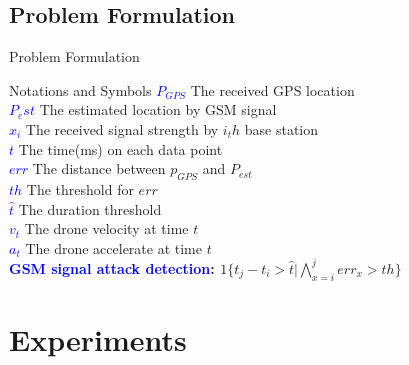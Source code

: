 \documentclass[aspectratio=169, 8pt]{beamer}
\begin{document}
\subsection{Problem Formulation}
\begin{frame}{Problem Formulation}
\begin{block}{Notations and Symbols}
    \textbf{\textcolor{blue}{$P_{GPS}$}} The received GPS location \\
    \textbf{\textcolor{blue}{$P_est$}} The estimated location by GSM signal \\
    
    \textbf{\textcolor{blue}{$x_i$}} The received signal strength by $i_th$ base station \\
    \textbf{\textcolor{blue}{$t$}} The time(ms) on each data point \\
    \textbf{\textcolor{blue}{$err$}} The distance between $p_{GPS}$ and $P_{est}$\\
    \textbf{\textcolor{blue}{$th$}} The threshold for $err$\\
    \textbf{\textcolor{blue}{$\hat{t}$}} The duration threshold \\
    \textbf{\textcolor{blue}{$v_t$}} The drone velocity at time $t$ \\
    \textbf{\textcolor{blue}{$a_t$}} The drone accelerate at time $t$ \\
     \textbf{\textcolor{blue}{GSM signal attack detection}: $1\{t_j-t_i>\hat{t}|\bigwedge_{x=i}^{j} err_x>th\}$}\\
    
\end{block}

\end{frame}







\section{Experiments}
\end{document}
